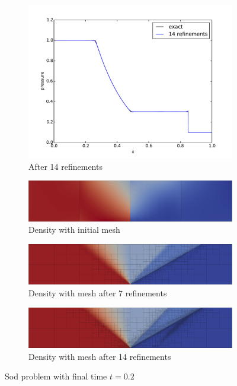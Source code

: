 \documentclass[preprint,12pt]{elsarticle}
\begin{document}
\begin{figure}[p]
\begin{subfigure}[c]{0.3\textwidth}
\includegraphics[width=\textwidth]{SpaceTimeCNS/Sod1e-5/pres15.pdf}
\caption{After 14 refinements}
\label{fig:sod_pres14}
\end{subfigure}
\begin{subfigure}[c]{0.45\textwidth}
\centering
\includegraphics[width=\textwidth]{SpaceTimeCNS/Sod1e-5/mesh1.png}
\caption{Density with initial mesh}
\label{fig:sod_mesh0}
\end{subfigure}
\begin{subfigure}[c]{0.45\textwidth}
\centering
\includegraphics[width=\textwidth]{SpaceTimeCNS/Sod1e-5/mesh8.png}
\caption{Density with mesh after 7 refinements}
\label{fig:sod_mesh7}
\end{subfigure}
\begin{subfigure}[c]{0.9\textwidth}
\centering
\includegraphics[width=\textwidth]{SpaceTimeCNS/Sod1e-5/mesh15.png}
\caption{Density with mesh after 14 refinements}
\label{fig:sod_mesh14}
\end{subfigure}
\caption{Sod problem with final time $t=0.2$}
\label{fig:sod}
\end{figure}
\end{document}
